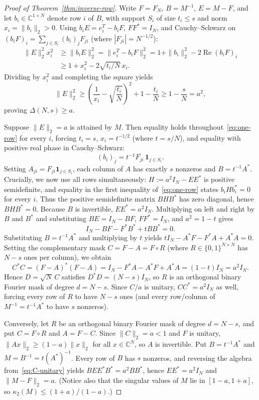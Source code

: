 \documentclass[11pt,reqno]{amsart}
\numberwithin{equation}{section}
\theoremstyle{definition}
\theoremstyle{remark}
\newcommand{\C}{\mathbb{C}}
\begin{document}
\begin{proof}[Proof of Theorem~\ref{thm:inverse-row}]
Write $F=F_N$, $B=M^{-1}$, $E=M-F$, and let $b_i\in\C^{1\times N}$ denote row $i$ of $B$, with support $S_i$ of size $t_i\le s$ and norm $x_i=\|b_i\|_2>0$. Using $b_i E = e_i^T - b_i F$, $FF^*=I_N$, and Cauchy--Schwarz on $(b_i F)_i = \sum_{j\in S_i} (b_i)_j F_{ji}$ (where $|F_{ji}|=N^{-1/2}$):
\begin{align}
\|E\|_2^2 x_i^2 &\ge \|b_i E\|_2^2 = \|e_i^T - b_i F\|_2^2
= 1 + \|b_i\|_2^2 - 2\operatorname{Re}(b_i F)_i \nonumber\\
&\ge 1 + x_i^2 - 2\sqrt{t_i/N}\, x_i. \label{eq:one-row}
\end{align}
Dividing by $x_i^2$ and completing the square yields
\[
\|E\|_2^2 \ge \left(\frac{1}{x_i} - \sqrt{\frac{t_i}{N}}\right)^2 + 1 - \frac{t_i}{N} \ge 1 - \frac{s}{N} = a^2,
\]
proving $\Delta(N,s)\ge a$.

Suppose $\|E\|_2 = a$ is attained by $M$. Then equality holds throughout~\eqref{eq:one-row} for every $i$, forcing $t_i=s$, $x_i=t^{-1/2}$ (where $t=s/N$), and equality with positive real phase in Cauchy--Schwarz:
\[
(b_i)_j = t^{-1}\overline{F_{ji}}\,\mathbf{1}_{j\in S_i}.
\]
Setting $A_{ji} = F_{ji}\mathbf{1}_{j\in S_i}$, each column of $A$ has exactly $s$ nonzeros and $B = t^{-1}A^*$. Crucially, we now use all rows simultaneously: $H := a^2 I_N - EE^*$ is positive semidefinite, and equality in the first inequality of~\eqref{eq:one-row} states $b_i H b_i^* = 0$ for every $i$. Thus the positive semidefinite matrix $BHB^*$ has zero diagonal, hence $BHB^*=0$. Because $B$ is invertible, $EE^*=a^2 I_N$. Multiplying on left and right by $B$ and $B^*$ and substituting $BE=I_N-BF$, $FF^*=I_N$, and $a^2=1-t$ gives
\[
I_N - BF - F^*B^* + t BB^* = 0.
\]
Substituting $B=t^{-1}A^*$ and multiplying by $t$ yields $t I_N - A^*F - F^*A + A^*A = 0$. Setting the complementary mask $C = F - A = F\circ R$ (where $R\in\{0,1\}^{N\times N}$ has $N-s$ ones per column), we obtain
\begin{equation}
\label{eq:C-unitary}
C^*C = (F-A)^*(F-A) = I_N - F^*A - A^*F + A^*A = (1-t)I_N = a^2 I_N.
\end{equation}
Hence $D = \sqrt{N}\,C$ satisfies $D^*D = (N-s)I_N$, so $R$ is an orthogonal binary Fourier mask of degree $d=N-s$. Since $C/a$ is unitary, $CC^*=a^2 I_N$ as well, forcing every row of $R$ to have $N-s$ ones (and every row/column of $M^{-1}=t^{-1}A^*$ to have $s$ nonzeros).

Conversely, let $R$ be an orthogonal binary Fourier mask of degree $d=N-s$, and put $C=F\circ R$ and $A=F-C$. Since $\|C\|_2 = a < 1$ and $F$ is unitary, $\|Ax\|_2\ge (1-a)\|x\|_2$ for all $x\in\C^N$, so $A$ is invertible. Put $B=t^{-1}A^*$ and $M=B^{-1}=t(A^*)^{-1}$. Every row of $B$ has $s$ nonzeros, and reversing the algebra from~\eqref{eq:C-unitary} yields $BEE^*B^* = a^2 BB^*$, hence $EE^*=a^2 I_N$ and $\|M-F\|_2 = a$. (Notice also that the singular values of $M$ lie in $[1-a,1+a]$, so $\kappa_2(M)\le (1+a)/(1-a)$.)


\end{proof}
\end{document}
